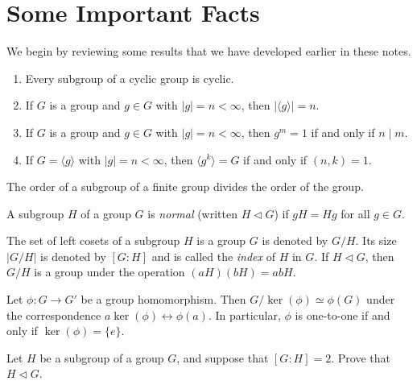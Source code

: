 \section{Some Important Facts}

We begin by reviewing some results that we have developed earlier in these notes.

\begin{theorem} \mbox{}
 \begin{enumerate}\renewcommand{\theenumi}{\alph{enumi}}
  \item
        Every subgroup of a cyclic group is cyclic.
  \item
        If $G$ is a group and $g\in G$ with $|g|=n<\infty$, then $|\langle g \rangle|=n$.
  \item
        If $G$ is a group and $g\in G$ with $|g|=n<\infty$, then $g^m = 1$ if and only if $n \mid m$.
  \item
        If $G = \langle g \rangle$ with $|g|=n<\infty$, then $\langle g^k \rangle = G$  if and only if $(n,k)=1$.
 \end{enumerate}
\end{theorem}

\begin{theorem}[Lagrange]
 The order of a subgroup of a finite group divides the order of the group.
\end{theorem}

\begin{definition}
 A subgroup $H$ of a group $G$ is \textit{normal} (written $H\lhd G$) if $gH = Hg$ for all $g\in G$.
\end{definition}

\begin{theorem}
 The set of left cosets of a subgroup $H$ is a group $G$ is denoted by $G/H$. Its size $|G/H|$ is denoted by $[G:H]$ and is called the \emph{index} of $H$ in $G$.
 If $H\lhd G$, then $G/H$ is a group under the operation $(aH)(bH)=abH$.
\end{theorem}

\begin{theorem}
 Let $\phi:G \longrightarrow G'$ be a group homomorphism. Then $G/\ker(\phi) \simeq \phi(G)$ under the correspondence $a\ker(\phi) \leftrightarrow \phi(a)$. In particular, $\phi$ is one-to-one if and only if $\ker(\phi) = \{e\}$.
\end{theorem}

\begin{problem}
Let $H$ be a subgroup of a group $G$, and suppose that $[G : H] = 2$.  Prove that $H \lhd G$.
\end{problem}



